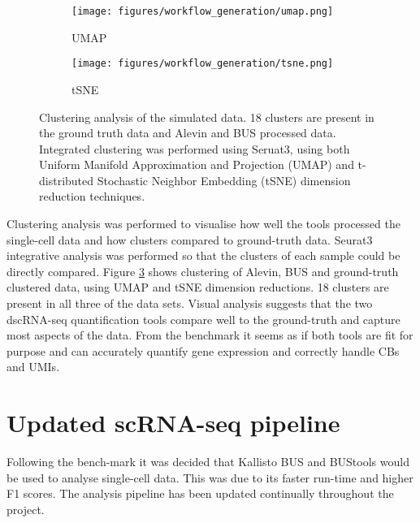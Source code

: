 \begin{figure}[ht]
\centering
\begin{subfigure}{0.7\textwidth}
    \texttt{[image: figures/workflow\_generation/umap.png]}
    \caption{UMAP}
    \label{fig:benchmark_UMAP}
\end{subfigure}
\medskip
\begin{subfigure}{0.7\textwidth}
    \texttt{[image: figures/workflow\_generation/tsne.png]}
    \caption{tSNE}
    \label{fig:benchmark_tsne}
\end{subfigure}
\caption[Benchmark Clustering Analysis]{Clustering analysis of the simulated data.
18 clusters are present in the ground truth data and Alevin and BUS processed data.
Integrated clustering was performed using Seruat3\cite{stuart2019comprehensive}, using both Uniform Manifold Approximation and Projection (UMAP) and  t-distributed Stochastic Neighbor Embedding (tSNE) dimension reduction techniques.}
\label{fig:benchmark_clustering}
\end{figure}

Clustering analysis was performed to visualise how well the tools processed the single-cell data and how clusters compared to ground-truth data.
Seurat3 integrative analysis was performed so that the clusters of each sample could be directly compared.
Figure \ref{fig:benchmark_clustering} shows clustering of Alevin, BUS and ground-truth clustered data, using UMAP and tSNE dimension reductions.
18 clusters are present in all three of the data sets.
Visual analysis suggests that the two dscRNA-seq quantification tools compare well to the ground-truth and capture most aspects of the data.
From the benchmark it seems as if both tools are fit for purpose and can accurately quantify gene expression and correctly handle CBs and UMIs.

\afterpage{\clearpage}


\section{Updated scRNA-seq pipeline}
Following the bench-mark it was decided that Kallisto BUS and BUStools would be used to analyse single-cell data.
This was due to its faster run-time and higher F1 scores.
The analysis pipeline has been updated continually throughout the project.

